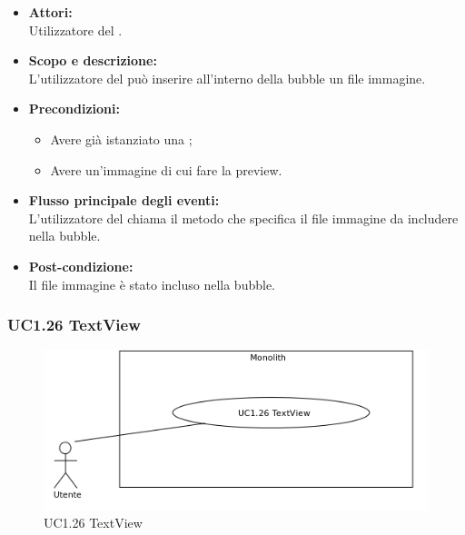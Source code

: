 \begin{itemize}
	\item \textbf{Attori:}
	\\Utilizzatore del .
	\item \textbf{Scopo e descrizione:} 
	\\L’utilizzatore del  può inserire all'interno della bubble un file immagine.
	\item \textbf{Precondizioni:}
	\begin{itemize}
		\item Avere già istanziato una ;
		\item Avere un'immagine di cui fare la preview.
	\end{itemize}
	\item \textbf{Flusso principale degli eventi:}
	\\L’utilizzatore del  chiama il metodo che specifica il file immagine da includere nella bubble.
	\item \textbf{Post-condizione:}
	\\Il file immagine è stato incluso nella bubble.
\end{itemize}

\subsubsection{UC1.26 TextView} \label{UC1.26}

\begin{figure}[H]
	\centering
	\includegraphics[width=15cm]{../../documenti/AnalisiDeiRequisiti/Diagrammi_img/uc1_26.png}
	\caption{UC1.26 TextView}
\end{figure}

